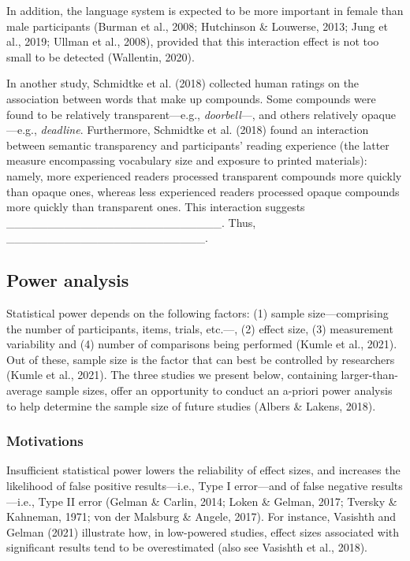 \documentclass[
  12pt,
  man,floatsintext]{apa7}
\begin{document}
In addition, the language system is expected to be more important in female than male participants (Burman et al., 2008; Hutchinson \& Louwerse, 2013; Jung et al., 2019; Ullman et al., 2008), provided that this interaction effect is not too small to be detected (Wallentin, 2020).

In another study, Schmidtke et al. (2018) collected human ratings on the association between words that make up compounds. Some compounds were found to be relatively transparent---e.g., \emph{doorbell}---, and others relatively opaque---e.g., \emph{deadline}. Furthermore, Schmidtke et al. (2018) found an interaction between semantic transparency and participants' reading experience (the latter measure encompassing vocabulary size and exposure to printed materials): namely, more experienced readers processed transparent compounds more quickly than opaque ones, whereas less experienced readers processed opaque compounds more quickly than transparent ones. This interaction suggests \_\_\_\_\_\_\_\_\_\_\_\_\_\_\_\_\_\_\_\_\_\_\_\_\_\_. Thus, \_\_\_\_\_\_\_\_\_\_\_\_\_\_\_\_\_\_\_\_\_\_\_\_.

\hypertarget{power-analysis}{%
\subsection{Power analysis}\label{power-analysis}}

Statistical power depends on the following factors: (1) sample size---comprising the number of participants, items, trials, etc.---, (2) effect size, (3) measurement variability and (4) number of comparisons being performed (Kumle et al., 2021). Out of these, sample size is the factor that can best be controlled by researchers (Kumle et al., 2021). The three studies we present below, containing larger-than-average sample sizes, offer an opportunity to conduct an a-priori power analysis to help determine the sample size of future studies (Albers \& Lakens, 2018).

\hypertarget{motivations}{%
\subsubsection{Motivations}\label{motivations}}

Insufficient statistical power lowers the reliability of effect sizes, and increases the likelihood of false positive results---i.e., Type I error---and of false negative results---i.e., Type II error (Gelman \& Carlin, 2014; Loken \& Gelman, 2017; Tversky \& Kahneman, 1971; von der Malsburg \& Angele, 2017). For instance, Vasishth and Gelman (2021) illustrate how, in low-powered studies, effect sizes associated with significant results tend to be overestimated (also see Vasishth et al., 2018).
\end{document}
